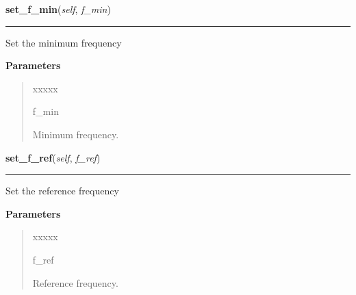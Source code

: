     \label{stochastic:StochasticNode:set_f_min}
    \vspace{0.5ex}

    \begin{boxedminipage}{\textwidth}

    \raggedright \textbf{set\_f\_min}(\textit{self}, \textit{f\_min})

    \vspace{-1.5ex}

    \rule{\textwidth}{0.5\fboxrule}
    Set the minimum frequency

    \vspace{1ex}

      \textbf{Parameters}
      \begin{quote}
        \begin{Ventry}{xxxxx}

          \item[f\_min]

          Minimum frequency.

        \end{Ventry}

      \end{quote}

    \vspace{1ex}

    \end{boxedminipage}

    \label{stochastic:StochasticNode:set_f_ref}
    \vspace{0.5ex}

    \begin{boxedminipage}{\textwidth}

    \raggedright \textbf{set\_f\_ref}(\textit{self}, \textit{f\_ref})

    \vspace{-1.5ex}

    \rule{\textwidth}{0.5\fboxrule}
    Set the reference frequency

    \vspace{1ex}

      \textbf{Parameters}
      \begin{quote}
        \begin{Ventry}{xxxxx}

          \item[f\_ref]

          Reference frequency.

        \end{Ventry}

      \end{quote}

    \vspace{1ex}

    \end{boxedminipage}

